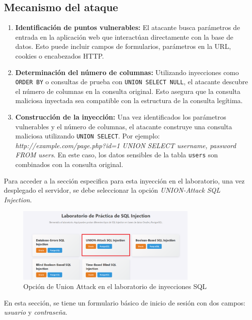 \documentclass[a4paper,12pt]{article}
\begin{document}
\subsection{Mecanismo del ataque}

\begin{enumerate}
    \item \textbf{Identificación de puntos vulnerables:} El atacante busca parámetros de entrada en la aplicación web que interactúan directamente con la base de datos. Esto puede incluir campos de formularios, parámetros en la URL, cookies o encabezados HTTP.
    
    \item \textbf{Determinación del número de columnas:} Utilizando inyecciones como \texttt{ORDER BY} o consultas de prueba con \texttt{UNION SELECT NULL}, el atacante descubre el número de columnas en la consulta original. Esto asegura que la consulta maliciosa inyectada sea compatible con la estructura de la consulta legítima.
    
    \item \textbf{Construcción de la inyección:} Una vez identificados los parámetros vulnerables y el número de columnas, el atacante construye una consulta maliciosa utilizando \texttt{UNION SELECT}. Por ejemplo: \textit{http://example.com/page.php?id=1 UNION SELECT username, password FROM users}. En este caso, los datos sensibles de la tabla \texttt{users} son combinados con la consulta original.
\end{enumerate}

Para acceder a la sección especifica para esta inyección en el laboratorio, una vez desplegado el servidor, se debe seleccionar la opción \textit{UNION-Attack SQL Injection}.

\begin{figure}[H]
    \centering
    \includegraphics[width=0.8\textwidth]{Imagenes/union1.png}
    \caption{Opción de Union Attack en el laboratorio de inyecciones SQL}
\end{figure}

En esta sección, se tiene un formulario básico de inicio de sesión con dos campos: \textit{usuario} y \textit{contraseña}.
\end{document}
